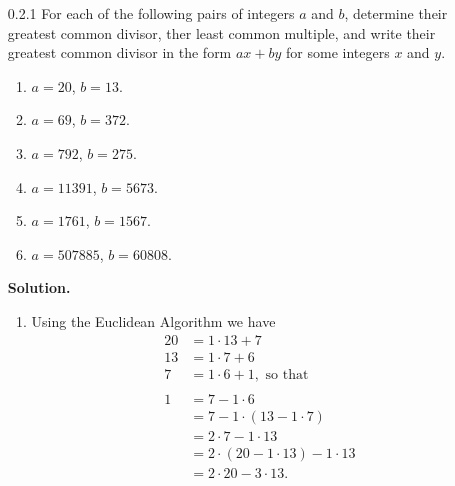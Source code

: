 \begin{enumerate}
   \item[0.2.1]   For each of the following pairs of integers $a$ and $b$,
                  determine their greatest common divisor, ther least common
                  multiple, and write their greatest common divisor in the form
                  $ax + by$ for some integers $x$ and $y$.
                  \begin{enumerate}
                     \item $a = 20$, $b = 13$.
                     \item $a = 69$, $b = 372$.
                     \item $a = 792$, $b = 275$.
                     \item $a = 11391$, $b = 5673$.
                     \item $a = 1761$, $b = 1567$.
                     \item $a = 507885$, $b = 60808$.
                  \end{enumerate}

      \textbf{Solution.}

      \begin{enumerate}
         \item Using the Euclidean Algorithm we have
               \begin{align*}
                  20 &= 1 \cdot 13 + 7 \\
                  13 &= 1 \cdot 7 + 6 \\
                  7  &= 1 \cdot 6 + 1, \text{ so that } \\ \\
                  1  &= 7 - 1 \cdot 6 \\
                     &= 7 - 1 \cdot (13 - 1 \cdot 7) \\
                     &= 2 \cdot 7 - 1 \cdot 13 \\
                     &= 2 \cdot (20 - 1 \cdot 13) - 1 \cdot 13 \\
                     &= 2 \cdot 20 - 3 \cdot 13.
               \end{align*}


\end{enumerate}
\end{enumerate}
